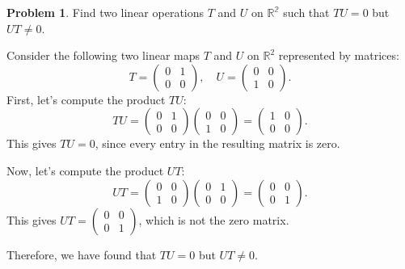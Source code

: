 \documentclass[12pt]{article}
\theoremstyle{definition}
\newtheorem{problem}{Problem}
\begin{document}
\begin{problem}
    Find two linear operations $T$ and $U$ on $\mathbb{R^2}$ such that $TU = 0$ but $UT \neq 0$.
    
    \begin{solution}
        Consider the following two linear maps \(T\) and \(U\) on \(\mathbb{R}^2\) represented by matrices:
        \[
        T = \begin{pmatrix} 0 & 1 \\ 0 & 0 \end{pmatrix}, \quad U = \begin{pmatrix} 0 & 0 \\ 1 & 0 \end{pmatrix}.
        \]
        First, let's compute the product \(TU\):
        \[
        TU = \begin{pmatrix} 0 & 1 \\ 0 & 0 \end{pmatrix} \begin{pmatrix} 0 & 0 \\ 1 & 0 \end{pmatrix} = \begin{pmatrix} 1 & 0 \\ 0 & 0 \end{pmatrix}.
        \]
        This gives \(TU = 0\), since every entry in the resulting matrix is zero.
    
        Now, let's compute the product \(UT\):
        \[
        UT = \begin{pmatrix} 0 & 0 \\ 1 & 0 \end{pmatrix} \begin{pmatrix} 0 & 1 \\ 0 & 0 \end{pmatrix} = \begin{pmatrix} 0 & 0 \\ 0 & 1 \end{pmatrix}.
        \]
        This gives \(UT = \begin{pmatrix} 0 & 0 \\ 0 & 1 \end{pmatrix}\), which is not the zero matrix.
    
        Therefore, we have found that \(TU = 0\) but \(UT \neq 0\).
    \end{solution}
\end{problem}
\end{document}
